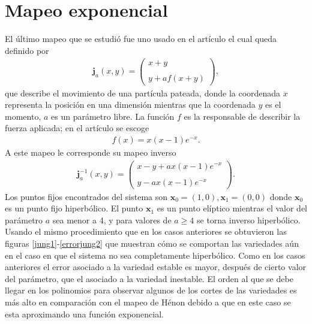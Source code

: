 \label{jung-seccion}\section{Mapeo exponencial}
El último mapeo que se estudió fue uno usado en el artículo \citep{Jung} el cual queda definido por 
\begin{eqnarray}
\mathbf{j}_{a}(x,y)=\left(\begin{array}{lcc}
             x+y\\
             \\ y+af(x+y)
             \end{array}\right),
\label{Jung}
\end{eqnarray}
que describe el movimiento de una partícula pateada, donde la coordenada $x$ representa la posición en una dimensión mientras que la coordenada $y$ es el momento, $a$ es un parámetro libre. La función $f$ es la responsable de describir la fuerza aplicada; en el artículo \cite{Jung} se escoge
\begin{eqnarray*}
f(x)=x(x-1)e^{-x}.
\end{eqnarray*}
A este mapeo le corresponde su mapeo inverso
\begin{eqnarray}
\mathbf{j}^{-1}_{a}(x,y)=\left(\begin{array}{lcc}
             x-y+ax(x-1)e^{-x}\\
             \\ y-ax(x-1)e^{-x}
             \end{array}\right).
             \label{jungI}
\end{eqnarray}
Los puntos fijos encontrados del sistema son $\mathbf{x}_{0}=(1,0), \mathbf{x}_{1}=(0,0)$ donde $\mathbf{x}_{0}$ es un punto fijo hiperbólico. El punto $\mathbf{x}_{1}$ es un punto elíptico mientras el valor del parámetro $a$ sea menor a 4, y para valores de $a \geq 4$ se torna inverso hiperbólico.\\

Usando el mismo procedimiento que en los casos anteriores se obtuvieron las figuras \ref{jung1}-\ref{errorjung2} que muestran cómo se comportan las variedades aún en el caso en que el sistema no sea completamente hiperbólico. Como en los casos anteriores el error asociado a la variedad estable es mayor, después de cierto valor del parámetro, que el asociado a la variedad inestable. El orden al que se debe llegar en los polinomios para observar algunos de los cortes de las variedades es más alto en comparación con el mapeo de Hénon debido a que en este caso se esta aproximando una función exponencial.

